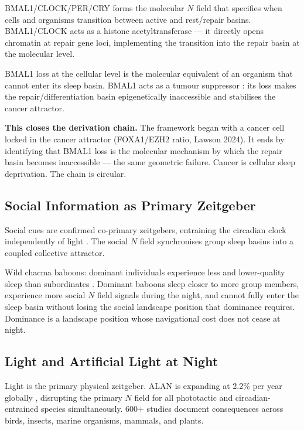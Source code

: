 \documentclass[10pt, a4paper]{article}
\begin{document}
BMAL1/CLOCK/PER/CRY forms the molecular
$N$ field that specifies when cells and
organisms transition between active and
rest/repair basins. BMAL1/CLOCK acts
as a histone acetyltransferase --- it
directly opens chromatin at repair
gene loci, implementing the transition
into the repair basin at the molecular
level.

BMAL1 loss at the cellular level is
the molecular equivalent of an organism
that cannot enter its sleep basin.
BMAL1 acts as a tumour suppressor
\cite{papagiannakopoulos2023bmal1}:
its loss makes the repair/differentiation
basin epigenetically inaccessible and
stabilises the cancer attractor.

\textbf{This closes the derivation
chain.} The framework began with a
cancer cell locked in the cancer
attractor (FOXA1/EZH2 ratio, Lawson
2024). It ends by identifying that
BMAL1 loss is the molecular mechanism
by which the repair basin becomes
inaccessible --- the same geometric
failure. Cancer is cellular sleep
deprivation. The chain is circular.

\subsection{Social Information as
Primary Zeitgeber}

Social cues are confirmed co-primary
zeitgebers, entraining the circadian
clock independently of light
\cite{social2023zeitgeber}. The social
$N$ field synchronises group sleep
basins into a coupled collective
attractor.

Wild chacma baboons: dominant
individuals experience less and
lower-quality sleep than subordinates
\cite{current_biology2025baboon}.
Dominant baboons sleep closer to more
group members, experience more social
$N$ field signals during the night,
and cannot fully enter the sleep basin
without losing the social landscape
position that dominance requires.
Dominance is a landscape position
whose navigational cost does not
cease at night.

\subsection{Light and Artificial Light
at Night}

Light is the primary physical zeitgeber.
ALAN is expanding at 2.2\% per year
globally \cite{royalsoc2023alan},
disrupting the primary $N$ field
for all phototactic and circadian-
entrained species simultaneously.
600+ studies document consequences
across birds, insects, marine organisms,
mammals, and plants.
\end{document}
